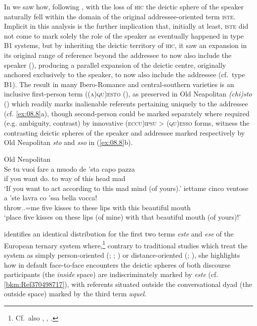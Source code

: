 \documentclass[output=paper]{langsci/langscibook}
\begin{document}
In  we saw how, following \citet{Vincent:1999ab}, with the
loss of \textsc{hic} the deictic sphere of the speaker naturally fell within
the domain of the original addressee-oriented term \textsc{iste}. Implicit in
this analysis is the further implication that, initially at least,
\textsc{iste} did not come to mark solely the role of the speaker as eventually
happened in type B1 systems, but by inheriting the deictic territory
of \textsc{hic,} it saw an expansion in its original range of reference beyond
the addressee to now also include the speaker
(\citealt[91--96]{ledgeway2004sviluppo}), producing a parallel expansion of the
deictic centre, originally anchored exclusively to the speaker, to now also
include the addressee (cf.\ type B1). The result in many Ibero-Romance
and central-southern  varieties is an inclusive first-person term
\textsc{((a)qu)esto} (\citealt[78--91]{ledgeway2004sviluppo}), as preserved in
Old Neapolitan \emph{(chi)sto} (\citealt[200--205]{Ledgeway:2009a}) which
readily marks inalienable referents pertaining uniquely to the addressee (cf.
\ref{ex:08.8}a), though second-person  could be marked separately where required
(e.g. ambiguity, contrast) by innovative (\textsc{eccu})\textsc{ipsu} >
\textsc{(qu)esso} forms, witness the contrasting deictic spheres of the speaker
and addressee marked respectively by Old Neapolitan \emph{sto} and \emph{sso}
in (\ref{ex:08.8}b).

\ea Old Neapolitan \citep{Ledgeway:2009a}\label{ex:08.8}\\
    \ea
    \gll  Se  tu  vuoi  fare  a  muodo  de  ’sta  capo  pazza\\
          if  you  want  do.\Inf{}  to  way  of  this  head  mad\\
    \glt    \enquote*{If you want to act according to this mad mind (of yours).}
    \ex
    \gll  iettame  cinco  ventose  a  ’ste  lavra  co ’ssa  bella  vocca!\\
             throw.\Imp{}.\Ssg{}=me  five  kisses  to  these  lips  with this  beautiful  mouth\\
    \glt \enquote*{place five kisses on these lips (of mine) with that beautiful mouth (of
    yours)!}
    \z
\z

\citet{Jungbluth:2003a,Jungbluth:2017a} identifies an identical distribution
for the first two terms \emph{este} and \emph{ese} of the European 
ternary system where,\footnote{Cf.\ also
    \citet{Gutierrez-Rexach:2002a,Gutierrez-Rexach:2005a},
    \citet[52]{Langacker:1990a},
\citet[245--247]{Gomez-Sanchez:2015a}.\label{fn:08.4}}
    contrary to traditional studies which treat the system as simply
    person-oriented (\citealt[109, 581, 585]{:1970a};
    \citealt[940]{Eguren:1999a}; \citealt[557]{Eguren:2012a}) or
    distance-oriented (\citealt{Hottenroth:1992a};
    \citealt[39]{Diessel1999}), she highlights how in default face-to-face
    encounters the deictic spheres of both discourse participants (the
    \emph{inside} space) are indiscriminately marked by \emph{este} (cf.
    \ref{bkm:Ref370498717}), with referents situated outside the conversational dyad (the
    outside space) marked by the third term \emph{aquel}.
\end{document}
